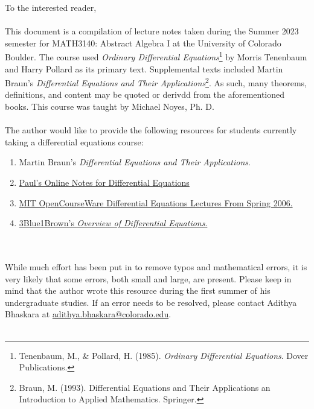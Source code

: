 To the interested reader,
\\
\\
This document is a compilation of lecture notes taken during the Summer 2023 semester for MATH3140: Abstract Algebra I at the University of Colorado Boulder. The course used \textit{Ordinary Differential Equations}\footnote{Tenenbaum, M., \& Pollard, H. (1985). \textit{Ordinary Differential Equations}. Dover Publications. } by Morris Tenenbaum and Harry Pollard as its primary text. Supplemental texts included Martin Braun's \textit{Differential Equations and Their Applications}\footnote{Braun, M. (1993). Differential Equations and Their Applications an Introduction to Applied Mathematics. Springer.}. As such, many theorems, definitions, and content may be quoted or derivdd from the aforementioned books. This course was taught by Michael Noyes, Ph. D.
\\
\\
The author would like to provide the following resources for students currently taking a differential equations course:
\begin{enumerate}
    \item Martin Braun's \textit{Differential Equations and Their Applications}.
    \item \href{https://tutorial.math.lamar.edu/classes/de/de.aspx}{Paul's Online Notes for Differential Equations}
    \item \href{https://www.youtube.com/playlist?list=PLEC88901EBADDD980}{MIT OpenCourseWare Differential Equations Lectures From Spring 2006.}
    \item \href{https://www.youtube.com/playlist?list=PLZHQObOWTQDNPOjrT6KVlfJuKtYTftqH6}{3Blue1Brown's \textit{Overview of Differential Equations}.}
\end{enumerate}
\vphantom
\\
\\
While much effort has been put in to remove typos and mathematical errors, it is very likely that some errors, both small and large, are present. Please keep in mind that the author wrote this resource during the first summer of his undergraduate studies. If an error needs to be resolved, please contact Adithya Bhaskara at \href{mailto:adithya.bhaskara@colorado.edu}{adithya.bhaskara@colorado.edu}.
\\
\\
\vfill
{}